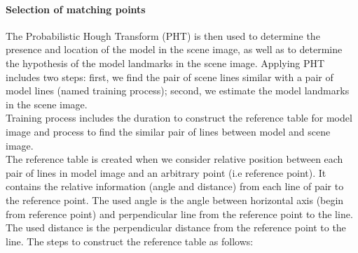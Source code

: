 \documentclass[twoside,twocolumn,10pt]{article}
\begin{document}
\paragraph{Selection of matching points}
The Probabilistic Hough Transform (PHT) is then used to determine the presence and location of the
model in the scene image, as well as to determine the hypothesis of
the model landmarks in the scene
image\cite{ashbrook1995robust}. Applying PHT includes two steps:
first, we find the pair of scene lines similar with a pair of
model lines (named training process); second, we estimate the model landmarks in the scene image.\\[0.2cm]
Training process includes the duration to construct the reference table for model image and process to find the similar pair of lines between model and scene image.\\
The reference table is created when we consider relative position between each pair of lines in model image and an arbitrary point (i.e reference point). It contains the relative information (angle and distance) from each line of pair to the reference point. The used angle is the angle between horizontal axis (begin from reference point) and perpendicular line from the reference point to the line. The used distance is the perpendicular distance from the reference point to the line. The steps to construct the reference table as follows:
\end{document}
